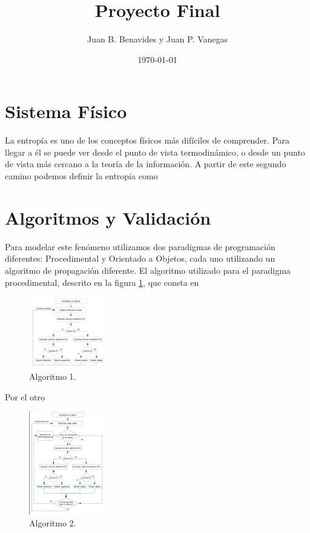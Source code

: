 \documentclass[12pt,twocolumn]{article}
\title{Proyecto Final}
\author{Juan B. Benavides y Juan P. Vanegas }
\date{\today}
\begin{document}
\maketitle

\section{\label{sec: Intro} Sistema Físico}
La entropía es uno de los conceptos físicos más difíciles de comprender. Para llegar a 
él se puede ver desde el punto de vista termodinámico, o desde un punto de vista más 
cercano a la teoría de la información. A partir de este segundo camino podemos definir la 
entropía como 

\section{Algoritmos y Validación}

Para modelar este fenómeno utilizamos dos paradigmas de programación diferentes: Procedimental 
y Orientado a Objetos, cada uno utilizando un algoritmo de propagación diferente. El 
algoritmo utilizado para el paradigma procedimental, descrito en la figura 
\ref{fig:algoritmo_Proc}, que consta en 

\begin{figure}
    \centering
    \includegraphics[width=0.3\textwidth]{figs/Algoritmo_Proc.png}
    \caption{Algoritmo 1.}
    \label{fig:algoritmo_Proc}
\end{figure}

Por el otro 

\begin{figure}
    \centering
    \includegraphics[width=0.3\textwidth]{figs/Algoritmo_OOP.png}
    \caption{Algoritmo 2.}
    \label{fig:algoritmo_OOP}
\end{figure}
\end{document}
